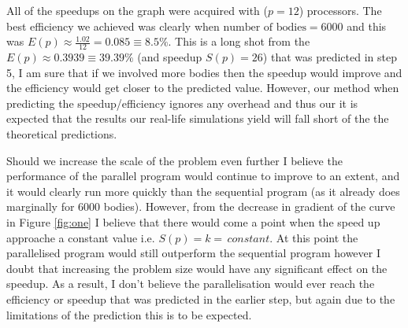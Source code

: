 \documentclass[12pt, a4paper]{article}
\begin{document}
\par All of the speedups on the graph were acquired with ($p=12$) processors. The best efficiency we achieved was clearly when $\text{number of bodies} = 6000$ and this was $E(p) \approx \frac{1.02}{12} = 0.085 \equiv 8.5\%$. This is a long shot from the $E(p) \approx 0.3939 \equiv 39.39\%$ (and speedup $S(p) =26$) that was predicted in step 5, I am sure that if we involved more bodies then the speedup would improve and the efficiency would get closer to the predicted value. However, our method when predicting the speedup/efficiency ignores any overhead and thus our it is expected that the results our real-life simulations yield will fall short of the the theoretical predictions.
 
 \par Should we increase the scale of the problem even further I believe the performance of the parallel program would continue to improve to an extent, and it would clearly run more quickly than the sequential program (as it already does marginally for $6000$ bodies). However, from the decrease in gradient of the curve in Figure \ref{fig:one} I believe that there would come a point when the speed up approache a constant value i.e. $S(p) = k = \, constant$. At this point the parallelised program would still outperform the sequential program however I doubt that increasing the problem size would have any significant effect on the speedup. As a result, I don't believe the parallelisation would ever reach the efficiency or speedup that was predicted in the earlier step, but again due to the limitations of the prediction this is to be expected. 
\end{document}
